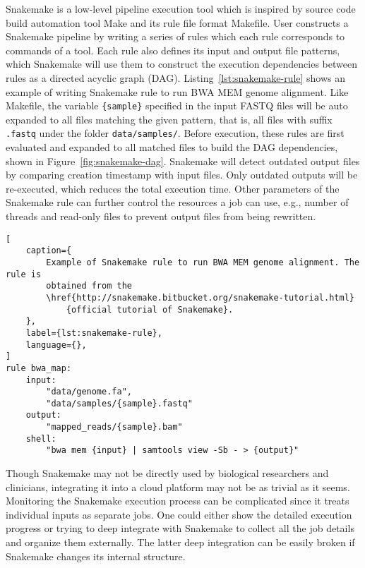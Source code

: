 Snakemake \cite{koster2012:snakemakea} is a low-level pipeline execution tool
which is inspired by source code build automation tool Make \cite{:gnu-make}
and its rule file format Makefile. User constructs a Snakemake pipeline by
writing a series of rules which each rule corresponds to commands of a tool.
Each rule also defines its input and output file patterns, which Snakemake will
use them to construct the execution dependencies between rules as a directed
acyclic graph (DAG). Listing~\ref{lst:snakemake-rule} shows an example of
writing Snakemake rule to run BWA MEM genome alignment. Like Makefile, the
variable \texttt{\{sample\}} specified in the input FASTQ files will be auto
expanded to all files matching the given pattern, that is, all files with
suffix \texttt{.fastq} under the folder \texttt{data/samples/}.  Before
execution, these rules are first evaluated and expanded to all matched files to
build the DAG dependencies, shown in Figure~\ref{fig:snakemake-dag}.  Snakemake
will detect outdated output files by comparing creation timestamp with input
files. Only outdated outputs will be re-executed, which reduces the total
execution time. Other parameters of the Snakemake rule can further control the
resources a job can use, e.g., number of threads and read-only files to prevent
output files from being rewritten.

\begin{lstlisting}[
    caption={
        Example of Snakemake rule to run BWA MEM genome alignment. The rule is
        obtained from the
        \href{http://snakemake.bitbucket.org/snakemake-tutorial.html}
            {official tutorial of Snakemake}.
    },
    label={lst:snakemake-rule},
    language={},
]
rule bwa_map:
    input:
        "data/genome.fa",
        "data/samples/{sample}.fastq"
    output:
        "mapped_reads/{sample}.bam"
    shell:
        "bwa mem {input} | samtools view -Sb - > {output}"
\end{lstlisting}



Though Snakemake may not be directly used by biological researchers and
clinicians, integrating it into a cloud platform may not be as trivial as it
seems. Monitoring the Snakemake execution process can be complicated since it
treats individual inputs as separate jobs. One could either show the detailed
execution progress or trying to deep integrate with Snakemake to collect all
the job details and organize them externally. The latter deep integration can
be easily broken if Snakemake changes its internal structure.

